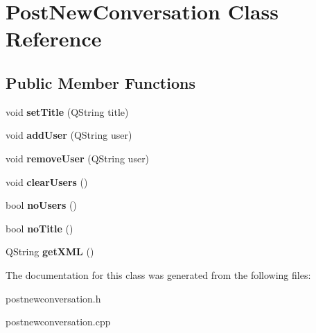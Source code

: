\hypertarget{classPostNewConversation}{\section{Post\-New\-Conversation Class Reference}
\label{classPostNewConversation}
}
\subsection*{Public Member Functions}
\begin{DoxyCompactItemize}
\item 
\hypertarget{classPostNewConversation_aa459a1f1a2e29802fd1366f673720a73}{void {\bfseries set\-Title} (Q\-String title)}\label{classPostNewConversation_aa459a1f1a2e29802fd1366f673720a73}

\item 
\hypertarget{classPostNewConversation_ad5e46d3f9cf18d3b755d316b6c566391}{void {\bfseries add\-User} (Q\-String user)}\label{classPostNewConversation_ad5e46d3f9cf18d3b755d316b6c566391}

\item 
\hypertarget{classPostNewConversation_a45df7b17fbb333dea9afcb1707789652}{void {\bfseries remove\-User} (Q\-String user)}\label{classPostNewConversation_a45df7b17fbb333dea9afcb1707789652}

\item 
\hypertarget{classPostNewConversation_a72bb26b00365f6193f1bf29faa643f90}{void {\bfseries clear\-Users} ()}\label{classPostNewConversation_a72bb26b00365f6193f1bf29faa643f90}

\item 
\hypertarget{classPostNewConversation_a93092a7591d0abc8de09e82c948b0177}{bool {\bfseries no\-Users} ()}\label{classPostNewConversation_a93092a7591d0abc8de09e82c948b0177}

\item 
\hypertarget{classPostNewConversation_a821171e9118e29d3cd873ab0d13f3cba}{bool {\bfseries no\-Title} ()}\label{classPostNewConversation_a821171e9118e29d3cd873ab0d13f3cba}

\item 
\hypertarget{classPostNewConversation_a892dd3df54101c8ab6c27a60e1d2a6a5}{Q\-String {\bfseries get\-X\-M\-L} ()}\label{classPostNewConversation_a892dd3df54101c8ab6c27a60e1d2a6a5}

\end{DoxyCompactItemize}


The documentation for this class was generated from the following files\-:\begin{DoxyCompactItemize}
\item 
postnewconversation.\-h\item 
postnewconversation.\-cpp\end{DoxyCompactItemize}
